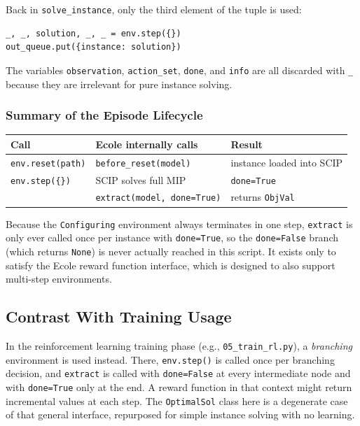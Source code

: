 Back in \texttt{solve\_instance}, only the third element of the tuple is used:

\begin{lstlisting}
_, _, solution, _, _ = env.step({})
out_queue.put({instance: solution})
\end{lstlisting}

The variables \texttt{observation}, \texttt{action\_set}, \texttt{done}, and \texttt{info} are all discarded with \texttt{\_} because they are irrelevant for pure instance solving.

\subsubsection{Summary of the Episode Lifecycle}

\begin{center}
\begin{tabular}{lll}
\toprule
\textbf{Call} & \textbf{Ecole internally calls} & \textbf{Result} \\
\midrule
\texttt{env.reset(path)} & \texttt{before\_reset(model)} & instance loaded into SCIP \\
\texttt{env.step(\{\})} & SCIP solves full MIP & \texttt{done=True} \\
                        & \texttt{extract(model, done=True)} & returns \texttt{ObjVal} \\
\bottomrule
\end{tabular}
\end{center}

Because the \texttt{Configuring} environment always terminates in one step, \texttt{extract} is only ever called once per instance with \texttt{done=True}, so the \texttt{done=False} branch (which returns \texttt{None}) is never actually reached in this script. It exists only to satisfy the Ecole reward function interface, which is designed to also support multi-step environments.

\subsection{Contrast With Training Usage}

In the reinforcement learning training phase (e.g., \texttt{05\_train\_rl.py}), a \emph{branching} environment is used instead. There, \texttt{env.step()} is called once per branching decision, and \texttt{extract} is called with \texttt{done=False} at every intermediate node and with \texttt{done=True} only at the end. A reward function in that context might return incremental values at each step. The \texttt{OptimalSol} class here is a degenerate case of that general interface, repurposed for simple instance solving with no learning.

